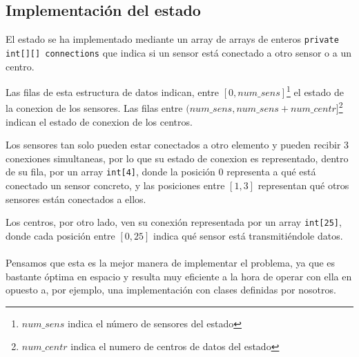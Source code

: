 \subsection{Implementación del estado}

El estado se ha implementado mediante un 
array de arrays de enteros \texttt{private int[][] connections} que indica
si un sensor está conectado a otro sensor o a un centro.

Las filas de esta estructura de datos indican, entre $[0, num\_sens]$\footnote{
$num\_sens$ indica el número de sensores del estado } el estado
de la conexion de los sensores. Las filas entre 
$(num\_sens, num\_sens + num\_centr]$\footnote{ $num\_centr$ indica el numero
de centros de datos del estado } indican el estado de conexion de los
centros.

Los sensores tan solo pueden estar conectados a otro elemento y pueden recibir
3 conexiones simultaneas, por lo que su estado de conexion es representado,
dentro de su fila, por un array \texttt{int[4]}, donde la posición 0 representa
a qué está conectado un sensor concreto, y las posiciones entre $[1, 3]$ 
representan qué otros sensores están conectados a ellos.

Los centros, por otro lado, ven su conexión representada por un array 
\texttt{int[25]}, donde cada posición entre $[0, 25]$ 
indica qué sensor está transmitiéndole datos.

\paragraph{}

Pensamos que esta es la mejor manera de implementar el problema,
ya que es bastante óptima en espacio y resulta muy eficiente a la
hora de operar con ella en opuesto a, por ejemplo, una 
implementación con clases definidas por nosotros.
